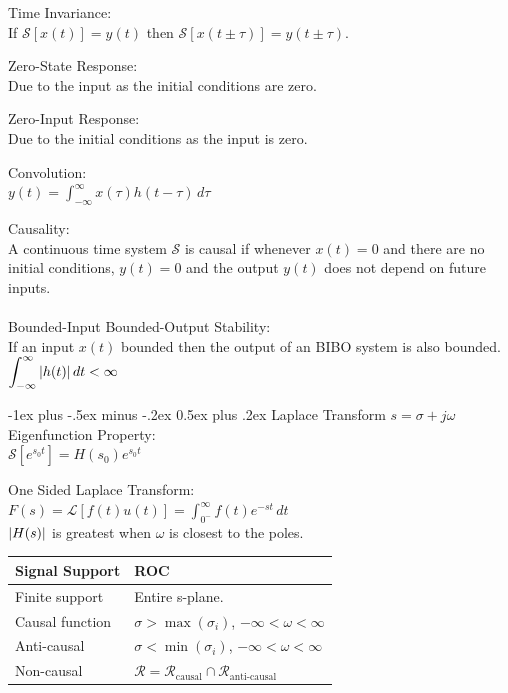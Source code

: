 \documentclass[12pt,landscape,letterpaper]{article}
\makeatletter
\renewcommand{\section}{\@startsection{section}{1}{0mm}%
                                {-1ex plus -.5ex minus -.2ex}%
                                {0.5ex plus .2ex}%
                                {\normalfont\normalsize\bfseries}}
\newcommand{\tab}{\hspace{0.02\textwidth}}
\newcommand{\ds}{\displaystyle}
\makeatother
\begin{document}
\begin{multicols*}{3}
Time Invariance:\\
\tab If $\mathcal{S}[x(t)] = y(t)$ then $\mathcal{S}[x(t \pm \tau)] = y(t \pm \tau)$.

Zero-State Response:\\
\tab Due to the input as the initial conditions are zero.

Zero-Input Response:\\
\tab Due to the initial conditions as the input is zero.

Convolution:\\
\tab $\ds y(t) = \int_{-\infty}^{\infty}x(\tau)h(t-\tau)\,d\tau$

Causality:\\
\tab A continuous time system $\mathcal{S}$ is causal if whenever $x(t) = 0$ and there are no initial conditions, $y(t) = 0$ and the output $y(t)$ does not depend on future inputs.
\\~\\
Bounded-Input Bounded-Output Stability:\\
\tab If an input $x(t)$ bounded then the output of an BIBO system is also bounded.\\
\tab $\ds \int_{-\infty}^{\infty} \abs{h(t)}\,dt < \infty$

\section{Laplace Transform}
$s = \sigma + j\omega$\\

Eigenfunction Property:\\
\tab $\mathcal{S}[e^{s_0t}] = H(s_0)e^{s_0t}$

One Sided Laplace Transform:\\
\tab $\ds F(s) = \mathcal{L}[f(t)u(t)] = \int_{0^-}^{\infty}f(t)e^{-st}\,dt$\\
\tab $\abs{H(s)}$ is greatest when $\omega$ is closest to the poles.

\begin{tabular}{ll}  
	\toprule
	Signal Support & ROC\\
	\midrule
	Finite support & Entire s-plane.\\
	Causal function & $\sigma > \max(\sigma_i)$,  $-\infty < \omega < \infty$\\
	Anti-causal & $\sigma < \min(\sigma_i)$,  $-\infty < \omega < \infty$\\
	Non-causal & $\mathcal{R} = \mathcal{R}_\text{causal} \cap \mathcal{R}_\text{anti-causal}$\\
	\bottomrule
\end{tabular}
\vspace{0.5em}


\end{multicols*}
\end{document}
